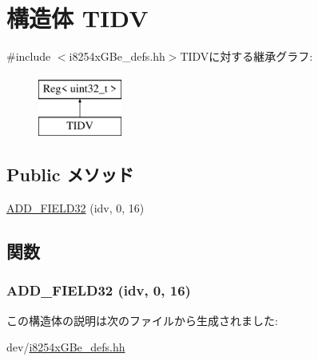 \hypertarget{structiGbReg_1_1Regs_1_1TIDV}{
\section{構造体 TIDV}
\label{structiGbReg_1_1Regs_1_1TIDV}
}


{\ttfamily \#include $<$i8254xGBe\_\-defs.hh$>$}TIDVに対する継承グラフ:\begin{figure}[H]
\begin{center}
\leavevmode
\includegraphics[height=2cm]{structiGbReg_1_1Regs_1_1TIDV}
\end{center}
\end{figure}
\subsection*{Public メソッド}
\begin{DoxyCompactItemize}
\item 
\hyperlink{structiGbReg_1_1Regs_1_1TIDV_adf6e0b872721f8ffd2f16c12a1b68e84}{ADD\_\-FIELD32} (idv, 0, 16)
\end{DoxyCompactItemize}


\subsection{関数}
\hypertarget{structiGbReg_1_1Regs_1_1TIDV_adf6e0b872721f8ffd2f16c12a1b68e84}{
\subsubsection[{ADD\_\-FIELD32}]{\setlength{\rightskip}{0pt plus 5cm}ADD\_\-FIELD32 (idv, \/  0, \/  16)}}
\label{structiGbReg_1_1Regs_1_1TIDV_adf6e0b872721f8ffd2f16c12a1b68e84}


この構造体の説明は次のファイルから生成されました:\begin{DoxyCompactItemize}
\item 
dev/\hyperlink{i8254xGBe__defs_8hh}{i8254xGBe\_\-defs.hh}\end{DoxyCompactItemize}
